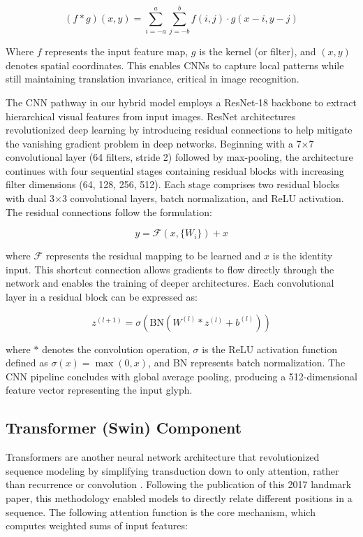 \documentclass[11pt,a4paper,oneside]{report}
\begin{document}
\begin{equation}
(f * g)(x,y) = \sum_{i=-a}^{a} \sum_{j=-b}^{b} f(i,j) \cdot g(x-i, y-j)
\end{equation}

Where $f$ represents the input feature map, $g$ is the kernel (or filter), and $(x,y)$ denotes spatial coordinates. This enables CNNs to capture local patterns while still maintaining translation invariance, critical in image recognition.

The CNN pathway in our hybrid model employs a ResNet-18 backbone \cite{he_deep_2015} to extract hierarchical visual features from input images. ResNet architectures revolutionized deep learning by introducing residual connections to help mitigate the vanishing gradient problem in deep networks. Beginning with a 7$\times$7 convolutional layer (64 filters, stride 2) followed by max-pooling, the architecture continues with four sequential stages containing residual blocks with increasing filter dimensions (64, 128, 256, 512). Each stage comprises two residual blocks with dual 3$\times$3 convolutional layers, batch normalization, and ReLU activation. The residual connections follow the formulation:

\begin{equation}
y = \mathcal{F}(x, \{W_i\}) + x
\end{equation}

where $\mathcal{F}$ represents the residual mapping to be learned and $x$ is the identity input. This shortcut connection allows gradients to flow directly through the network and enables the training of deeper architectures. Each convolutional layer in a residual block can be expressed as:

\begin{equation}
z^{(l+1)} = \sigma\left(\text{BN}\left(W^{(l)} \ast z^{(l)} + b^{(l)}\right)\right)
\end{equation}

where $\ast$ denotes the convolution operation, $\sigma$ is the ReLU activation function defined as $\sigma(x) = \max(0,x)$, and BN represents batch normalization. The CNN pipeline concludes with global average pooling, producing a 512-dimensional feature vector representing the input glyph.

\subsection{Transformer (Swin) Component}
\noindent\hspace{1cm}
Transformers are another neural network architecture that revolutionized sequence modeling by simplifying transduction down to only attention, rather than recurrence or convolution \cite{vaswani_attention_2023}. Following the publication of this 2017 landmark paper, this methodology enabled models to directly relate different positions in a sequence. The following attention function is the core mechanism, which computes weighted sums of input features:
\end{document}
